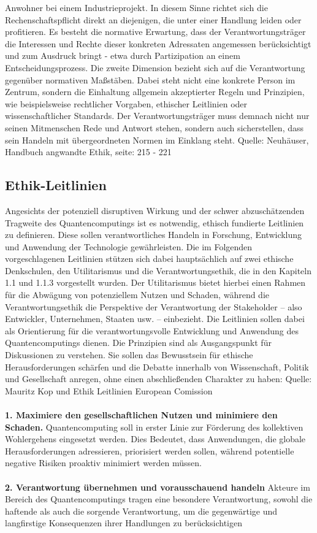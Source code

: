 Anwohner bei einem Industrieprojekt. In diesem Sinne richtet sich die Rechenschaftspflicht direkt an diejenigen, die unter einer Handlung leiden oder profitieren. Es besteht die normative Erwartung, dass der Verantwortungsträger die Interessen und Rechte dieser konkreten Adressaten angemessen berücksichtigt und zum Ausdruck bringt - etwa durch Partizipation an einem Entscheidungsprozess. Die zweite Dimension bezieht sich auf die Verantwortung gegenüber normativen Maßstäben. Dabei steht nicht eine konkrete Person im Zentrum, sondern die Einhaltung allgemein akzeptierter Regeln und Prinzipien, wie beispielsweise rechtlicher Vorgaben, ethischer Leitlinien oder wissenschaftlicher Standards. Der Verantwortungsträger muss demnach nicht nur seinen Mitmenschen Rede und Antwort stehen, sondern auch sicherstellen, dass sein Handeln mit übergeordneten Normen im Einklang steht. \cite{}
Quelle: Neuhäuser, Handbuch angwandte Ethik, seite: 215 - 221


\subsection{Ethik-Leitlinien}

Angesichts der potenziell disruptiven Wirkung und der schwer abzuschätzenden Tragweite des Quantencomputings ist es notwendig, ethisch fundierte Leitlinien zu definieren. Diese sollen verantwortliches Handeln in Forschung, Entwicklung und Anwendung der Technologie gewährleisten. Die im Folgenden vorgeschlagenen Leitlinien stützen sich dabei hauptsächlich auf zwei ethische Denkschulen, den Utilitarismus und die Verantwortungsethik, die in den Kapiteln 1.1 und 1.1.3 vorgestellt wurden. Der Utilitarismus bietet hierbei einen Rahmen für die Abwägung von potenziellem Nutzen und Schaden, während die Verantwortungsethik die Perspektive der Verantwortung der Stakeholder – also Entwickler, Unternehmen, Staaten usw. – einbezieht. Die Leitlinien sollen dabei als Orientierung für die verantwortungsvolle Entwicklung und Anwendung des Quantencomputings dienen. Die Prinzipien sind als Ausgangspunkt für Diskussionen zu verstehen. Sie sollen das Bewusstsein für ethische Herausforderungen schärfen und die Debatte innerhalb von Wissenschaft, Politik und Gesellschaft anregen, ohne einen abschließenden Charakter zu haben: 
\cite{} Quelle: Mauritz Kop und Ethik Leitlinien European Comission
\\
\\
\textbf{1. Maximiere den gesellschaftlichen Nutzen und minimiere den Schaden.}
Quantencomputing soll in erster Linie zur Förderung des kollektiven Wohlergehens eingesetzt werden. Dies Bedeutet, dass Anwendungen, die globale Herausforderungen adressieren, priorisiert werden sollen, während potentielle negative Risiken proaktiv minimiert werden müssen. 
\\
\\
\textbf{2. Verantwortung übernehmen und vorausschauend handeln}
Akteure im Bereich des Quantencomputings tragen eine besondere Verantwortung, sowohl die haftende als auch die sorgende Verantwortung, um die gegenwärtige und langfirstige Konsequenzen ihrer Handlungen zu berücksichtigen


